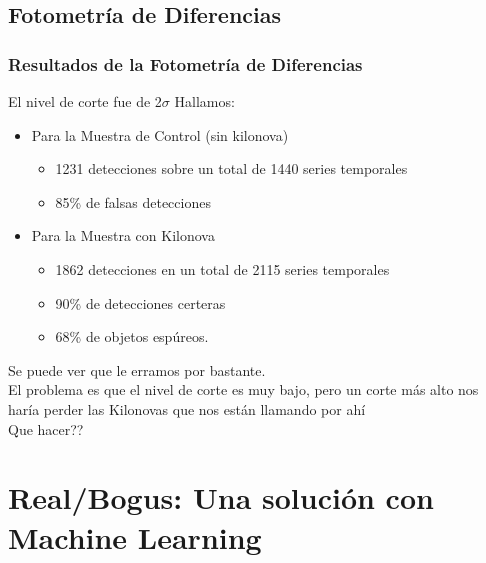 \documentclass[10pt]{beamer}
\begin{document}
\subsection{Fotometr\'{i}a de Diferencias}
\begin{frame} \frametitle{Resultados de la Fotometr\'{i}a de Diferencias}
 El nivel de corte fue de 2$\sigma$
 Hallamos:
  \begin{itemize}%
    \item Para la Muestra de Control (sin kilonova)
      \begin{itemize}
	\item 1231 detecciones sobre un total de 1440 series temporales
	\item 85\% de falsas detecciones
      \end{itemize}
    \item Para la Muestra con Kilonova
      \begin{itemize}
	\item 1862 detecciones en un total de 2115 series temporales
	\item 90\% de detecciones certeras
	\item 68\% de objetos esp\'ureos.
      \end{itemize}
  \end{itemize}
 Se puede ver que le erramos por bastante.\\
 El problema es que el nivel de corte es muy bajo, pero un corte m\'as 
 alto nos har\'{i}a perder las Kilonovas que nos est\'an llamando por ah\'{i} \\ \pause
 Que hacer??
\end{frame}
\section{Real/Bogus: Una soluci\'on con Machine Learning}
\frame{
\tableofcontents[ 
    currentsection, 
    sectionstyle=show/hide, 
    sectionstyle=show/shaded, 
    ]}
\end{document}
